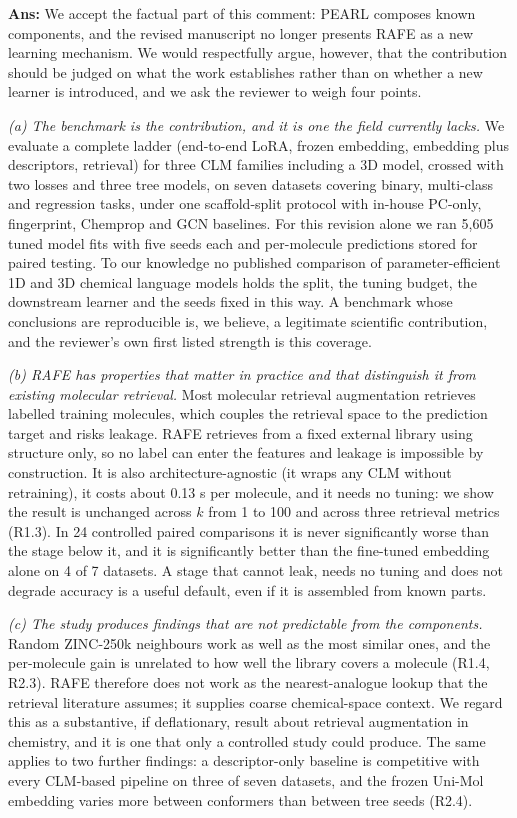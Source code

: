 \documentclass[
  10pt,
]{article}
\begin{document}
\textbf{Ans:} We accept the factual part of this comment: PEARL composes
known components, and the revised manuscript no longer presents RAFE as
a new learning mechanism. We would respectfully argue, however, that the
contribution should be judged on what the work establishes rather than
on whether a new learner is introduced, and we ask the reviewer to weigh
four points.

\emph{(a) The benchmark is the contribution, and it is one the field
currently lacks.} We evaluate a complete ladder (end-to-end LoRA, frozen
embedding, embedding plus descriptors, retrieval) for three CLM families
including a 3D model, crossed with two losses and three tree models, on
seven datasets covering binary, multi-class and regression tasks, under
one scaffold-split protocol with in-house PC-only, fingerprint, Chemprop
and GCN baselines. For this revision alone we ran 5,605 tuned model fits
with five seeds each and per-molecule predictions stored for paired
testing. To our knowledge no published comparison of parameter-efficient
1D and 3D chemical language models holds the split, the tuning budget,
the downstream learner and the seeds fixed in this way. A benchmark
whose conclusions are reproducible is, we believe, a legitimate
scientific contribution, and the reviewer's own first listed strength is
this coverage.

\emph{(b) RAFE has properties that matter in practice and that
distinguish it from existing molecular retrieval.} Most molecular
retrieval augmentation retrieves labelled training molecules, which
couples the retrieval space to the prediction target and risks leakage.
RAFE retrieves from a fixed external library using structure only, so no
label can enter the features and leakage is impossible by construction.
It is also architecture-agnostic (it wraps any CLM without retraining),
it costs about 0.13 s per molecule, and it needs no tuning: we show the
result is unchanged across \(k\) from 1 to 100 and across three
retrieval metrics (R1.3). In 24 controlled paired comparisons it is
never significantly worse than the stage below it, and it is
significantly better than the fine-tuned embedding alone on 4 of 7
datasets. A stage that cannot leak, needs no tuning and does not degrade
accuracy is a useful default, even if it is assembled from known parts.

\emph{(c) The study produces findings that are not predictable from the
components.} Random ZINC-250k neighbours work as well as the most
similar ones, and the per-molecule gain is unrelated to how well the
library covers a molecule (R1.4, R2.3). RAFE therefore does not work as
the nearest-analogue lookup that the retrieval literature assumes; it
supplies coarse chemical-space context. We regard this as a substantive,
if deflationary, result about retrieval augmentation in chemistry, and
it is one that only a controlled study could produce. The same applies
to two further findings: a descriptor-only baseline is competitive with
every CLM-based pipeline on three of seven datasets, and the frozen
Uni-Mol embedding varies more between conformers than between tree seeds
(R2.4).
\end{document}
